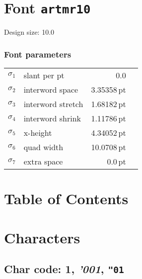 \documentclass{article}
\newlength{\maxcharwidth}
\begin{document}
\setlength{\maxcharwidth}{79.4281pt}
\addtolength{\maxcharwidth}{2\fboxsep}

\section{Font \texttt{artmr10}}


Design size: 10.0\,

\subsubsection{Font parameters}

\begin{tabular}{@{}llr@{\quad}l}
$\sigma_1$ & slant per pt & 0.0 \\
$\sigma_2$ & interword space & 3.35358\,pt \\
$\sigma_3$ & interword stretch & 1.68182\,pt \\
$\sigma_4$ & interword shrink & 1.11786\,pt \\
$\sigma_5$ & x-height & 4.34052\,pt \\
$\sigma_6$ & quad width & 10.0708\,pt \\
$\sigma_7$ & extra space & 0.0\,pt \\
\end{tabular}

\clearpage

\section{Table of Contents}

\begingroup



\endgroup

\clearpage

\section{Characters}

\subsection{Char code: 1, {\it'001}, {\tt"01}}
\label{char_1}
\end{document}
